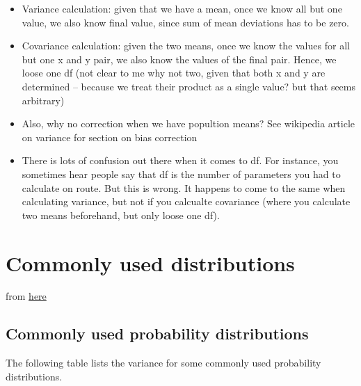 \documentclass[
  letterpaper,
  DIV=11,
  numbers=noendperiod]{scrreprt}
\begin{document}
\begin{itemize}
\item
  Variance calculation: given that we have a mean, once we know all but
  one value, we also know final value, since sum of mean deviations has
  to be zero.
\item
  Covariance calculation: given the two means, once we know the values
  for all but one x and y pair, we also know the values of the final
  pair. Hence, we loose one df (not clear to me why not two, given that
  both x and y are determined -- because we treat their product as a
  single value? but that seems arbitrary)
\item
  Also, why no correction when we have popultion means? See wikipedia
  article on variance for section on bias correction
\item
  There is lots of confusion out there when it comes to df. For
  instance, you sometimes hear people say that df is the number of
  parameters you had to calculate on route. But this is wrong. It
  happens to come to the same when calculating variance, but not if you
  calcualte covariance (where you calculate two means beforehand, but
  only loose one df).
\end{itemize}

\hypertarget{commonly-used-distributions}{%
\section{Commonly used
distributions}\label{commonly-used-distributions}}

from \href{https://en.wikipedia.org/wiki/Variance}{here}

\hypertarget{commonly-used-probability-distributions}{%
\subsection{Commonly used probability
distributions}\label{commonly-used-probability-distributions}}

The following table lists the variance for some commonly used
probability distributions.
\end{document}
